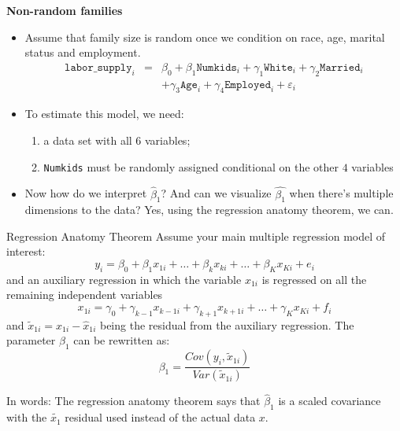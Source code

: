 \documentclass[notes=show]{beamer}
\begin{document}
\begin{frame}[plain]
\begin{center}
\textbf{Non-random families}
\end{center}
	
	\begin{itemize}
	\item Assume that family size is random once we condition on race, age, marital status and employment. 
		\begin{eqnarray*}
		\texttt{labor\_supply}_i &=& \beta_0 + \beta_1 \texttt{Numkids}_i + \gamma_1 \texttt{White}_i + \gamma_2 \texttt{Married}_i \\
		& & + \gamma_3 \texttt{Age}_i + \gamma_4 \texttt{Employed}_i + \varepsilon_i
		\end{eqnarray*}
	\item To estimate this model, we need:
		\begin{enumerate}
		\item a data set with all $6$ variables; 
		\item \texttt{Numkids} must be randomly assigned conditional on the other $4$ variables
		\end{enumerate}
	\item Now how do we interpret $\widehat{\beta}_1$?  And can we visualize $\widehat{\beta_1}$ when there's multiple dimensions to the data?  Yes, using the regression anatomy theorem, we can.
	\end{itemize}
	
\end{frame}
		

\begin{frame}[plain]

	\begin{block}{Regression Anatomy Theorem}
	Assume your main multiple regression model of interest:$$y_i=\beta_0 + \beta_1x_{1i} + \dots + \beta_kx_{ki} + \dots + \beta_Kx_{Ki} + e_i$$ and an auxiliary regression in which the variable $x_{1i}$ is regressed on all the remaining independent variables$$x_{1i} = \gamma_0 + \gamma_{k-1}x_{k-1 i}+\gamma_{k+1}x_{k+1 i} + \dots + \gamma_Kx_{Ki}+f_i$$and $\tilde{x}_{1i} = x_{1i} - \widehat{x}_{1i}$ being the residual from the auxiliary regression. The parameter $\beta_1$ can be rewritten as:$$\beta_1=\frac{Cov(y_i,\tilde{x}_{1i})}{Var(\tilde{x}_{1i})}$$


	\end{block}
	In words: The regression anatomy theorem says that $\widehat{\beta}_1$ is a scaled covariance with the $\tilde{x_1}$ residual used instead of the actual data $x$. 

\end{frame}
\end{document}
